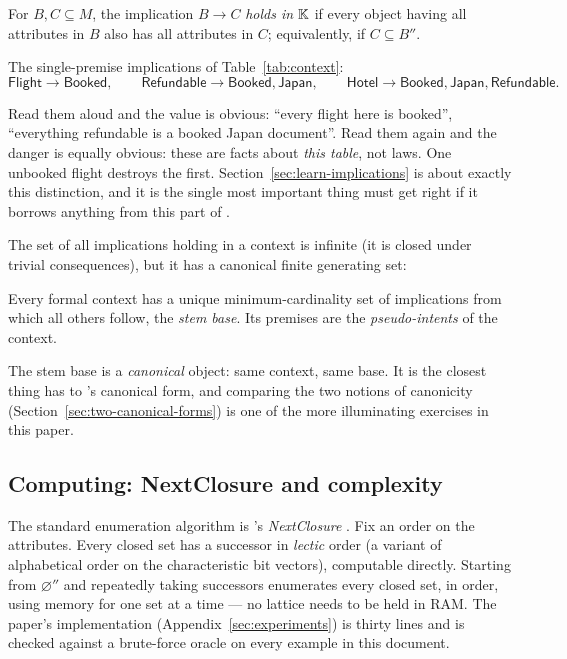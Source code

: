 \begin{definition}
For $B, C \subseteq M$, the implication $B \to C$ \emph{holds in} $\mathbb{K}$ if
every object having all attributes in $B$ also has all attributes in $C$;
equivalently, if $C \subseteq B''$.
\end{definition}

\begin{measured}
The single-premise implications of Table~\ref{tab:context}:
\[
\textsf{Flight} \to \textsf{Booked}, \qquad
\textsf{Refundable} \to \textsf{Booked}, \textsf{Japan}, \qquad
\textsf{Hotel} \to \textsf{Booked}, \textsf{Japan}, \textsf{Refundable}.
\]
\end{measured}

Read them aloud and the value is obvious: ``every flight here is booked'',
``everything refundable is a booked Japan document''. Read them again and the
danger is equally obvious: these are facts about \emph{this table}, not laws.
One unbooked flight destroys the first. Section~\ref{sec:learn-implications}
is about exactly this distinction, and it is the single most important thing
\odag{} must get right if it borrows anything from this part of \fca{}.

The set of all implications holding in a context is infinite (it is closed
under trivial consequences), but it has a canonical finite generating set:

\begin{theorem}
Every formal context has a unique minimum-cardinality set of implications from
which all others follow, the \emph{stem base}. Its premises are the
\emph{pseudo-intents} of the context.
\end{theorem}

The stem base is a \emph{canonical} object: same context, same base. It is the
closest thing \fca{} has to \odag{}'s canonical form, and comparing the two
notions of canonicity (Section~\ref{sec:two-canonical-forms}) is one of the
more illuminating exercises in this paper.

\subsection{Computing: NextClosure and complexity}
\label{sec:algorithms}

The standard enumeration algorithm is \citeauthor{ganter1984}'s
\emph{NextClosure} \citeyearpar{ganter1984}. Fix an order on the attributes.
Every closed set has a successor in \emph{lectic} order (a variant of
alphabetical order on the characteristic bit vectors), computable directly.
Starting from $\varnothing''$ and repeatedly taking successors enumerates every
closed set, in order, using memory for one set at a time --- no lattice needs
to be held in RAM. The paper's implementation
(Appendix~\ref{sec:experiments}) is thirty lines and is checked against a
brute-force oracle on every example in this document.


